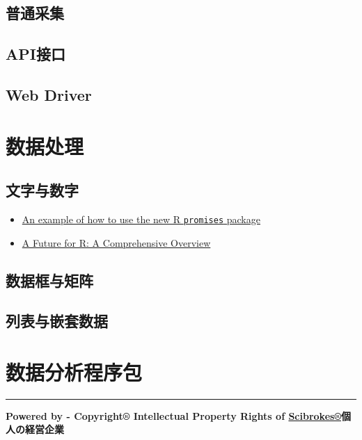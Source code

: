 \documentclass[]{book}
\providecommand{\tightlist}{%
  \setlength{\itemsep}{0pt}\setlength{\parskip}{0pt}}
\theoremstyle{definition}
\theoremstyle{definition}
\theoremstyle{definition}
\theoremstyle{remark}
\begin{document}
\subsection{普通采集}

\subsection{API接口}\label{api}

\subsection{Web Driver}\label{web-driver}

\section{数据处理}

\subsection{文字与数字}

\begin{itemize}
\tightlist
\item
  \href{https://appsilon.com/an-example-of-how-to-use-the-new-r-promises-package/}{An
  example of how to use the new R \texttt{promises} package}
\item
  \href{https://cran.r-project.org/web/packages/future/vignettes/future-1-overview.html}{A
  Future for R: A Comprehensive Overview}
\end{itemize}

\subsection{数据框与矩阵}

\subsection{列表与嵌套数据}

\section{数据分析程序包}

\begin{center}\rule{0.5\linewidth}{\linethickness}\end{center}

\textbf{Powered by - Copyright® Intellectual Property Rights of
\href{http://www.scibrokes.com}{Scibrokes®}個人の経営企業}
\end{document}
